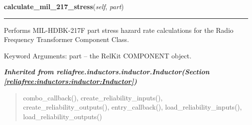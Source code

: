 \hspace{.8\funcindent}\begin{boxedminipage}{\funcwidth}

    \raggedright \textbf{calculate\_mil\_217\_stress}(\textit{self}, \textit{part})

    \vspace{-1.5ex}

    \rule{\textwidth}{0.5\fboxrule}
\setlength{\parskip}{2ex}
    Performs MIL-HDBK-217F part stress hazard rate calculations for the 
    Radio Frequency Transformer Component Class.

    Keyword Arguments: part -- the RelKit COMPONENT object.

\setlength{\parskip}{1ex}
    \end{boxedminipage}


\large{\textbf{\textit{Inherited from reliafree.inductors.inductor.Inductor\textit{(Section \ref{reliafree:inductors:inductor:Inductor})}}}}

\begin{quote}
combo\_callback(), create\_reliability\_inputs(), create\_reliability\_outputs(), entry\_callback(), load\_reliability\_inputs(), load\_reliability\_outputs()
\end{quote}
